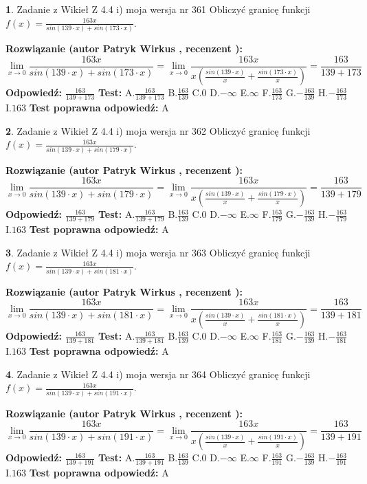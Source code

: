 \documentclass[12pt, a4paper]{article}
\theoremstyle{definition} %
\newtheorem{zad}{}
\newcommand{\zadStart}[1]{\begin{zad}#1\newline}
\newcommand{\zadStop}{\end{zad}}
\newcommand{\rozwStart}[2]{\noindent \textbf{Rozwiązanie (autor #1 , recenzent #2): }\newline}
\newcommand{\rozwStop}{\newline}
\newcommand{\odpStart}{\noindent \textbf{Odpowiedź:}\newline}
\newcommand{\odpStop}{\newline}
\newcommand{\testStart}{\noindent \textbf{Test:}\newline}
\newcommand{\testStop}{\newline}
\newcommand{\kluczStart}{\noindent \textbf{Test poprawna odpowiedź:}\newline}
\newcommand{\kluczStop}{\newline}
\begin{document}
\zadStart{Zadanie z Wikieł Z 4.4 i) moja wersja nr 361}
Obliczyć granicę funkcji $f(x)=\frac{163x}{sin(139\cdot x) +sin(173\cdot x)}$.
\zadStop
\rozwStart{Patryk Wirkus}{}
$$\lim\limits_{x\to 0}\frac{163x}{sin(139\cdot x) +sin(173\cdot x)}=\lim\limits_{x\to 0}\frac{163x}{x(\frac{sin(139\cdot x)}{x}+\frac{sin(173\cdot x)}{x})}=\frac{163}{139+173}$$
\rozwStop
\odpStart
$\frac{163}{139+173}$
\odpStop
\testStart
A.$\frac{163}{139+173}$
B.$\frac{163}{139}$
C.$0$
D.$-\infty$
E.$\infty$
F.$\frac{163}{173}$
G.$-\frac{163}{139}$
H.$-\frac{163}{173}$
I.$163$
\testStop
\kluczStart
A
\kluczStop



\zadStart{Zadanie z Wikieł Z 4.4 i) moja wersja nr 362}
Obliczyć granicę funkcji $f(x)=\frac{163x}{sin(139\cdot x) +sin(179\cdot x)}$.
\zadStop
\rozwStart{Patryk Wirkus}{}
$$\lim\limits_{x\to 0}\frac{163x}{sin(139\cdot x) +sin(179\cdot x)}=\lim\limits_{x\to 0}\frac{163x}{x(\frac{sin(139\cdot x)}{x}+\frac{sin(179\cdot x)}{x})}=\frac{163}{139+179}$$
\rozwStop
\odpStart
$\frac{163}{139+179}$
\odpStop
\testStart
A.$\frac{163}{139+179}$
B.$\frac{163}{139}$
C.$0$
D.$-\infty$
E.$\infty$
F.$\frac{163}{179}$
G.$-\frac{163}{139}$
H.$-\frac{163}{179}$
I.$163$
\testStop
\kluczStart
A
\kluczStop



\zadStart{Zadanie z Wikieł Z 4.4 i) moja wersja nr 363}
Obliczyć granicę funkcji $f(x)=\frac{163x}{sin(139\cdot x) +sin(181\cdot x)}$.
\zadStop
\rozwStart{Patryk Wirkus}{}
$$\lim\limits_{x\to 0}\frac{163x}{sin(139\cdot x) +sin(181\cdot x)}=\lim\limits_{x\to 0}\frac{163x}{x(\frac{sin(139\cdot x)}{x}+\frac{sin(181\cdot x)}{x})}=\frac{163}{139+181}$$
\rozwStop
\odpStart
$\frac{163}{139+181}$
\odpStop
\testStart
A.$\frac{163}{139+181}$
B.$\frac{163}{139}$
C.$0$
D.$-\infty$
E.$\infty$
F.$\frac{163}{181}$
G.$-\frac{163}{139}$
H.$-\frac{163}{181}$
I.$163$
\testStop
\kluczStart
A
\kluczStop



\zadStart{Zadanie z Wikieł Z 4.4 i) moja wersja nr 364}
Obliczyć granicę funkcji $f(x)=\frac{163x}{sin(139\cdot x) +sin(191\cdot x)}$.
\zadStop
\rozwStart{Patryk Wirkus}{}
$$\lim\limits_{x\to 0}\frac{163x}{sin(139\cdot x) +sin(191\cdot x)}=\lim\limits_{x\to 0}\frac{163x}{x(\frac{sin(139\cdot x)}{x}+\frac{sin(191\cdot x)}{x})}=\frac{163}{139+191}$$
\rozwStop
\odpStart
$\frac{163}{139+191}$
\odpStop
\testStart
A.$\frac{163}{139+191}$
B.$\frac{163}{139}$
C.$0$
D.$-\infty$
E.$\infty$
F.$\frac{163}{191}$
G.$-\frac{163}{139}$
H.$-\frac{163}{191}$
I.$163$
\testStop
\kluczStart
A
\kluczStop
\end{document}
